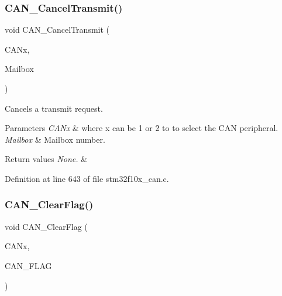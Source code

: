 \subsubsection{\texorpdfstring{C\+A\+N\+\_\+\+Cancel\+Transmit()}{CAN\_CancelTransmit()}}
{\footnotesize\ttfamily void C\+A\+N\+\_\+\+Cancel\+Transmit (\begin{DoxyParamCaption}\item[{\hyperlink{struct_c_a_n___type_def}{C\+A\+N\+\_\+\+Type\+Def} $\ast$}]{C\+A\+Nx,  }\item[{uint8\+\_\+t}]{Mailbox }\end{DoxyParamCaption})}



Cancels a transmit request. 


\begin{DoxyParams}{Parameters}
{\em C\+A\+Nx} & where x can be 1 or 2 to to select the C\+AN peripheral. \\
\hline
{\em Mailbox} & Mailbox number. \\
\hline
\end{DoxyParams}

\begin{DoxyRetVals}{Return values}
{\em None.} & \\
\hline
\end{DoxyRetVals}


Definition at line 643 of file stm32f10x\+\_\+can.\+c.

\mbox{\label{group___c_a_n___exported___functions_ga2c01646d5d3a2d7045e8dd71f58f8742}} 
\subsubsection{\texorpdfstring{C\+A\+N\+\_\+\+Clear\+Flag()}{CAN\_ClearFlag()}}
{\footnotesize\ttfamily void C\+A\+N\+\_\+\+Clear\+Flag (\begin{DoxyParamCaption}\item[{\hyperlink{struct_c_a_n___type_def}{C\+A\+N\+\_\+\+Type\+Def} $\ast$}]{C\+A\+Nx,  }\item[{uint32\+\_\+t}]{C\+A\+N\+\_\+\+F\+L\+AG }\end{DoxyParamCaption})}




